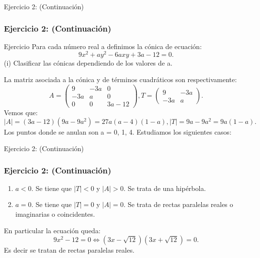 \documentclass[xcolor={dvipsnames},aspectratio=169,10pt]{beamer}
\begin{document}
\begin{frame}{Ejercicio 2: (Continuación)}
  \frametitle{Ejercicio 2: (Continuación)}
  \begin{block}{Ejercicio}
  Para cada número real a definimos la cónica de ecuación:
  \[9x^2 + ay^2 - 6axy + 3a - 12 = 0.\]
  (i) Clasificar las cónicas dependiendo de los valores de a.
  \end{block}
  La matriz asociada a la cónica y de términos cuadráticos son respectivamente:
  \[A = \begin{pmatrix} 9 & -3a & 0 \\ -3a & a & 0 \\ 0 & 0 & 3a - 12 \end{pmatrix}, T = \begin{pmatrix} 9 & -3a \\ -3a & a \end{pmatrix}.\]
  Vemos que:
  \[|A| = (3a - 12)(9a - 9a^2) = 27a(a - 4)(1 - a), |T| = 9a - 9a^2 = 9a(1 - a).\]
  Los puntos donde se anulan son a = 0, 1, 4. Estudiamos los siguientes casos:
\end{frame}

\begin{frame}{Ejercicio 2: (Continuación)}
  \frametitle{Ejercicio 2: (Continuación)}
  \begin{enumerate}[label=(\roman*)]
    \item $a < 0$. Se tiene que $|T| < 0$ y $|A| > 0$. Se trata de una hipérbola.
    \item $a = 0$. Se tiene que $|T| = 0$ y $|A| = 0$. Se trata de rectas paralelas reales o imaginarias o coincidentes.
  \end{enumerate}
  En particular la ecuación queda:
  \[9x^2 - 12 = 0 \Leftrightarrow (3x - \sqrt{12})(3x + \sqrt{12}) = 0.\]
  Es decir se tratan de rectas paralelas reales.
\end{frame}
\end{document}

